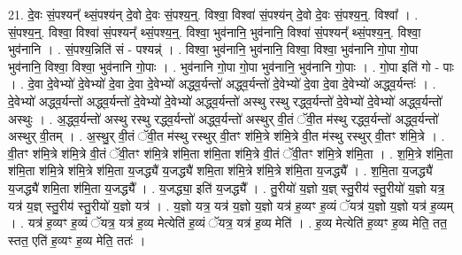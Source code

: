 \documentclass[17pt]{extarticle}
\begin{document}
21. दे॒वः सं॒पश्यन्᳚ थ्सं॒पश्य॑न् दे॒वो दे॒वः सं॒पश्य॒न्॒. विश्वा॒ विश्वा॑ सं॒पश्य॑न् दे॒वो दे॒वः सं॒पश्य॒न्॒. विश्वा᳚ । . सं॒पश्य॒न्॒. विश्वा॒ विश्वा॑ सं॒पश्यन्᳚ थ्सं॒पश्य॒न्॒. विश्वा॒ भुव॑नानि॒ भुव॑नानि॒ विश्वा॑ सं॒पश्यन्᳚ थ्सं॒पश्य॒न्॒. विश्वा॒ भुव॑नानि । . सं॒पश्य॒न्निति॑ सं - पश्यन्न्॑ । . विश्वा॒ भुव॑नानि॒ भुव॑नानि॒ विश्वा॒ विश्वा॒ भुव॑नानि गो॒पा गो॒पा भुव॑नानि॒ विश्वा॒ विश्वा॒ भुव॑नानि गो॒पाः । . भुव॑नानि गो॒पा गो॒पा भुव॑नानि॒ भुव॑नानि गो॒पाः । . गो॒पा इति॑ गो - पाः । . दे॒वा दे॒वेभ्यो॑ दे॒वेभ्यो॑ दे॒वा दे॒वा दे॒वेभ्यो॑ अद्ध्व॒र्यन्तो॑ अद्ध्व॒र्यन्तो॑ दे॒वेभ्यो॑ दे॒वा दे॒वा दे॒वेभ्यो॑ अद्ध्व॒र्यन्तः॑ । . दे॒वेभ्यो॑ अद्ध्व॒र्यन्तो॑ अद्ध्व॒र्यन्तो॑ दे॒वेभ्यो॑ दे॒वेभ्यो॑ अद्ध्व॒र्यन्तो॑ अस्थु रस्थु रद्ध्व॒र्यन्तो॑ दे॒वेभ्यो॑ दे॒वेभ्यो॑ अद्ध्व॒र्यन्तो॑ अस्थुः । . अ॒द्ध्व॒र्यन्तो॑ अस्थु रस्थु रद्ध्व॒र्यन्तो॑ अद्ध्व॒र्यन्तो॑ अस्थुर् वी॒तं ॅवी॒त म॑स्थु रद्ध्व॒र्यन्तो॑ 
अद्ध्व॒र्यन्तो॑ अस्थुर् वी॒तम् । . अ॒स्थु॒र् वी॒तं ॅवी॒त म॑स्थु रस्थुर् वी॒तꣳ श॑मि॒त्रे श॑मि॒त्रे वी॒त म॑स्थु रस्थुर् वी॒तꣳ श॑मि॒त्रे । . वी॒तꣳ श॑मि॒त्रे श॑मि॒त्रे वी॒तं ॅवी॒तꣳ श॑मि॒त्रे श॑मि॒ता श॑मि॒ता श॑मि॒त्रे वी॒तं ॅवी॒तꣳ श॑मि॒त्रे श॑मि॒ता । . श॒मि॒त्रे श॑मि॒ता श॑मि॒ता श॑मि॒त्रे श॑मि॒त्रे श॑मि॒ता य॒जद्ध्यै॑ य॒जद्ध्यै॑ शमि॒ता श॑मि॒त्रे श॑मि॒त्रे श॑मि॒ता य॒जद्ध्यै᳚ । . श॒मि॒ता य॒जद्ध्यै॑ य॒जद्ध्यै॑ शमि॒ता श॑मि॒ता य॒जद्ध्यै᳚ । . य॒जद्ध्या॒ इति॑ य॒जद्ध्यै᳚ । . तु॒रीयो॑ य॒ज्ञो य॒ज्ञ् स्तु॒रीय॑ स्तु॒रीयो॑ य॒ज्ञो यत्र॒ यत्र॑ य॒ज्ञ् स्तु॒रीय॑ स्तु॒रीयो॑ य॒ज्ञो यत्र॑ । . य॒ज्ञो यत्र॒ यत्र॑ य॒ज्ञो य॒ज्ञो यत्र॑ ह॒व्यꣳ ह॒व्यं ॅयत्र॑ य॒ज्ञो य॒ज्ञो यत्र॑ ह॒व्यम् । . यत्र॑ ह॒व्यꣳ ह॒व्यं ॅयत्र॒ यत्र॑ ह॒व्य मेत्येति॑ ह॒व्यं ॅयत्र॒ यत्र॑ ह॒व्य मेति॑ । . ह॒व्य मेत्येति॑ ह॒व्यꣳ ह॒व्य मेति॒ तत॒ स्तत॒ एति॑ ह॒व्यꣳ ह॒व्य मेति॒ ततः॑ । \newline
\end{document}
